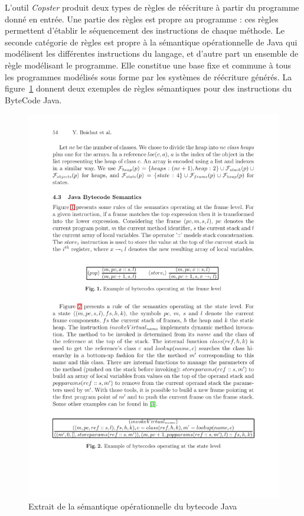 L'outil \emph{Copster} produit deux types de règles de réécriture à
partir du programme donné en entrée.  Une partie des règles est propre
au programme : ces règles permettent d'établir le séquencement des
instructions de chaque méthode.  Le seconde catégorie de règles est
propre à la sémantique opérationnelle de Java qui modélisent les
différentes instructions du langage, et d'autre part un ensemble de
règle modélisant le programme. Elle constitue une base fixe et commune à tous
les programmes modélisés sous forme par les systèmes de réécriture générés.
La figure~\ref{fig:semantique-java} donnent deux exemples de règles
sémantiques pour des instructions du ByteCode Java.

\begin{figure}[ht!]
  \centering
  \includegraphics[scale=1.3]{jvm_1}
  \caption{\footnotesize Extrait de la sémantique opérationnelle du bytecode Java}
  \label{fig:semantique-java}
\end{figure}

